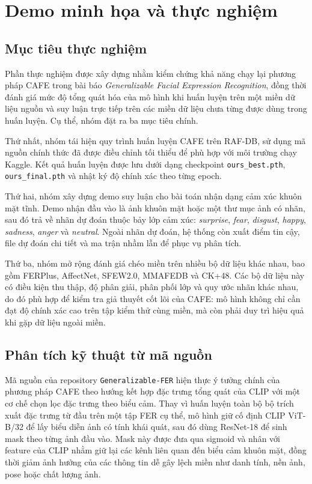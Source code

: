 \section{Demo minh họa và thực nghiệm}

\subsection{Mục tiêu thực nghiệm}

    Phần thực nghiệm được xây dựng nhằm kiểm chứng khả năng chạy lại phương pháp CAFE trong bài báo \textit{Generalizable Facial Expression Recognition}, đồng thời đánh giá mức độ tổng quát hóa của mô hình khi huấn luyện trên một miền dữ liệu nguồn và suy luận trực tiếp trên các miền dữ liệu chưa từng được dùng trong huấn luyện. Cụ thể, nhóm đặt ra ba mục tiêu chính.

    Thứ nhất, nhóm tái hiện quy trình huấn luyện CAFE trên RAF-DB, sử dụng mã nguồn chính thức đã được điều chỉnh tối thiểu để phù hợp với môi trường chạy Kaggle. Kết quả huấn luyện được lưu dưới dạng checkpoint \texttt{ours\_best.pth}, \texttt{ours\_final.pth} và nhật ký độ chính xác theo từng epoch.

    Thứ hai, nhóm xây dựng demo suy luận cho bài toán nhận dạng cảm xúc khuôn mặt tĩnh. Demo nhận đầu vào là ảnh khuôn mặt hoặc một thư mục ảnh có nhãn, sau đó trả về nhãn dự đoán thuộc bảy lớp cảm xúc: \textit{surprise}, \textit{fear}, \textit{disgust}, \textit{happy}, \textit{sadness}, \textit{anger} và \textit{neutral}. Ngoài nhãn dự đoán, hệ thống còn xuất điểm tin cậy, file dự đoán chi tiết và ma trận nhầm lẫn để phục vụ phân tích.

    Thứ ba, nhóm mở rộng đánh giá chéo miền trên nhiều bộ dữ liệu khác nhau, bao gồm FERPlus, AffectNet, SFEW2.0, MMAFEDB và CK+48. Các bộ dữ liệu này có điều kiện thu thập, độ phân giải, phân phối lớp và quy ước nhãn khác nhau, do đó phù hợp để kiểm tra giả thuyết cốt lõi của CAFE: mô hình không chỉ cần đạt độ chính xác cao trên tập kiểm thử cùng miền, mà còn phải duy trì hiệu quả khi gặp dữ liệu ngoài miền.


\subsection{Phân tích kỹ thuật từ mã nguồn}

Mã nguồn của repository \texttt{Generalizable-FER} hiện thực ý tưởng chính của phương pháp CAFE theo hướng kết hợp đặc trưng tổng quát của CLIP với một cơ chế chọn lọc đặc trưng theo biểu cảm. Thay vì huấn luyện toàn bộ bộ trích xuất đặc trưng từ đầu trên một tập FER cụ thể, mô hình giữ cố định CLIP ViT-B/32 để lấy biểu diễn ảnh có tính khái quát, sau đó dùng ResNet-18 để sinh mask theo từng ảnh đầu vào. Mask này được đưa qua sigmoid và nhân với feature của CLIP nhằm giữ lại các kênh liên quan đến biểu cảm khuôn mặt, đồng thời giảm ảnh hưởng của các thông tin dễ gây lệch miền như danh tính, nền ảnh, pose hoặc chất lượng ảnh.


